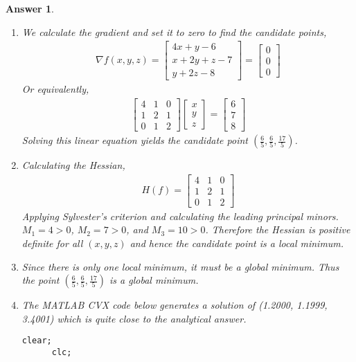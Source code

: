 \documentclass[12pt]{article}
\theoremstyle{colon}
\newtheorem*{answer}{Answer}
\begin{document}
\begin{answer}
  \leavevmode
  \begin{enumerate}[label=\arabic*)]
    \item We calculate the gradient and set it to zero to find the candidate points,
      \begin{gather*}
        \nabla f(x,y,z) = \begin{bmatrix}
          4x + y - 6 \\
          x + 2y + z - 7 \\
          y + 2z - 8
        \end{bmatrix} = \begin{bmatrix}
          0 \\
          0 \\
          0
        \end{bmatrix}
      \end{gather*}
      Or equivalently,
      \begin{gather*}
        \begin{bmatrix}
          4 & 1 & 0 \\
          1 & 2 & 1 \\
          0 & 1 & 2
        \end{bmatrix}\begin{bmatrix}
          x \\
          y \\
          z
        \end{bmatrix} = \begin{bmatrix}
          6 \\
          7 \\
          8
        \end{bmatrix}
      \end{gather*}
      Solving this linear equation yields the candidate point $(\frac{6}{5}, \frac{6}{5}, \frac{17}{5})$.
    \item Calculating the Hessian,
      \begin{gather*}
        H(f) = \begin{bmatrix}
          4 & 1 & 0 \\
          1 & 2 & 1 \\
          0 & 1 & 2
        \end{bmatrix}
      \end{gather*}
      Applying Sylvester's criterion and calculating the leading principal minors. $M_1 = 4 > 0$, $M_2 = 7 > 0$, and $M_3 = 10 > 0$. Therefore the Hessian is positive definite for all $(x,y,z)$ and hence the candidate point is a local minimum.
    \item Since there is only one local minimum, it must be a global minimum. Thus the point $(\frac{6}{5}, \frac{6}{5}, \frac{17}{5})$ is a global minimum.
    \item The MATLAB CVX code below generates a solution of (1.2000, 1.1999, 3.4001) which is quite close to the analytical answer.
    \begin{lstlisting}[style=Matlab-editor, basicstyle=\scriptsize]
      clear;
      clc;


\end{lstlisting}
\end{enumerate}
\end{answer}
\end{document}
